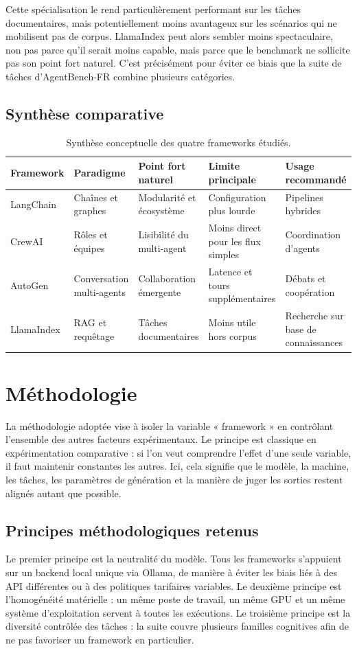 \documentclass[11pt,a4paper]{article}
\begin{document}
Cette spécialisation le rend particulièrement performant sur les tâches documentaires, mais potentiellement moins avantageux sur les scénarios qui ne mobilisent pas de corpus. LlamaIndex peut alors sembler moins spectaculaire, non pas parce qu'il serait moins capable, mais parce que le benchmark ne sollicite pas son point fort naturel. C'est précisément pour éviter ce biais que la suite de tâches d'AgentBench-FR combine plusieurs catégories.

\subsection{Synthèse comparative}
\begin{table}[H]
\centering
\small
\begin{tabularx}{\textwidth}{@{}lXXXX@{}}
\toprule
Framework & Paradigme & Point fort naturel & Limite principale & Usage recommandé \\
\midrule
LangChain & Chaînes et graphes & Modularité et écosystème & Configuration plus lourde & Pipelines hybrides \\
CrewAI & Rôles et équipes & Lisibilité du multi-agent & Moins direct pour les flux simples & Coordination d'agents \\
AutoGen & Conversation multi-agents & Collaboration émergente & Latence et tours supplémentaires & Débats et coopération \\
LlamaIndex & RAG et requêtage & Tâches documentaires & Moins utile hors corpus & Recherche sur base de connaissances \\
\bottomrule
\end{tabularx}
\caption{Synthèse conceptuelle des quatre frameworks étudiés.}
\label{tab:frameworks}
\end{table}

\section{Méthodologie}
\label{sec:methodologie}
La méthodologie adoptée vise à isoler la variable « framework » en contrôlant l'ensemble des autres facteurs expérimentaux. Le principe est classique en expérimentation comparative : si l'on veut comprendre l'effet d'une seule variable, il faut maintenir constantes les autres. Ici, cela signifie que le modèle, la machine, les tâches, les paramètres de génération et la manière de juger les sorties restent alignés autant que possible.

\subsection{Principes méthodologiques retenus}
Le premier principe est la neutralité du modèle. Tous les frameworks s'appuient sur un backend local unique via Ollama, de manière à éviter les biais liés à des API différentes ou à des politiques tarifaires variables. Le deuxième principe est l'homogénéité matérielle : un même poste de travail, un même GPU et un même système d'exploitation servent à toutes les exécutions. Le troisième principe est la diversité contrôlée des tâches : la suite couvre plusieurs familles cognitives afin de ne pas favoriser un framework en particulier.
\end{document}
